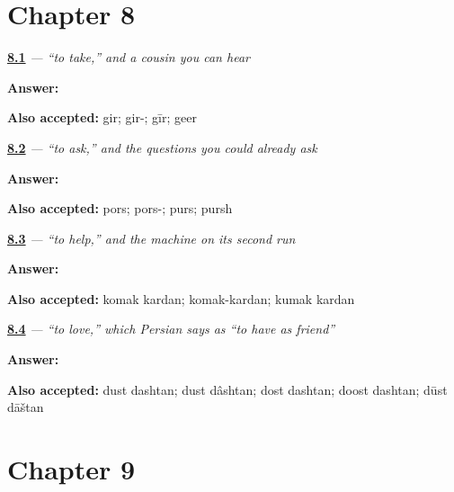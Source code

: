\section*{Chapter 8}

\noindent\begin{minipage}[t]{\linewidth}
\raggedright
\hyperlink{review-FA-C08-gereftan-stem}{\textbf{8.1}} \emph{ — “to take,” and a cousin you can hear}\par
\small \textbf{Answer:} \par
\footnotesize \textbf{Also accepted:} gir; gir-; gīr; geer
\end{minipage}\par\medskip

\noindent\begin{minipage}[t]{\linewidth}
\raggedright
\hyperlink{review-FA-C08-porsidan-stem}{\textbf{8.2}} \emph{ — “to ask,” and the questions you could already ask}\par
\small \textbf{Answer:} \par
\footnotesize \textbf{Also accepted:} pors; pors-; purs; pursh
\end{minipage}\par\medskip

\noindent\begin{minipage}[t]{\linewidth}
\raggedright
\hyperlink{review-FA-C08-komak-kardan-verb}{\textbf{8.3}} \emph{  — “to help,” and the machine on its second run}\par
\small \textbf{Answer:}  \par
\footnotesize \textbf{Also accepted:} komak kardan; komak-kardan; kumak kardan
\end{minipage}\par\medskip

\noindent\begin{minipage}[t]{\linewidth}
\raggedright
\hyperlink{review-FA-C08-dust-dashtan-literal}{\textbf{8.4}} \emph{  — “to love,” which Persian says as “to have as friend”}\par
\small \textbf{Answer:}  \par
\footnotesize \textbf{Also accepted:} dust dashtan; dust dâshtan; dost dashtan; doost dashtan; dūst dāštan
\end{minipage}\par\medskip

\section*{Chapter 9}

